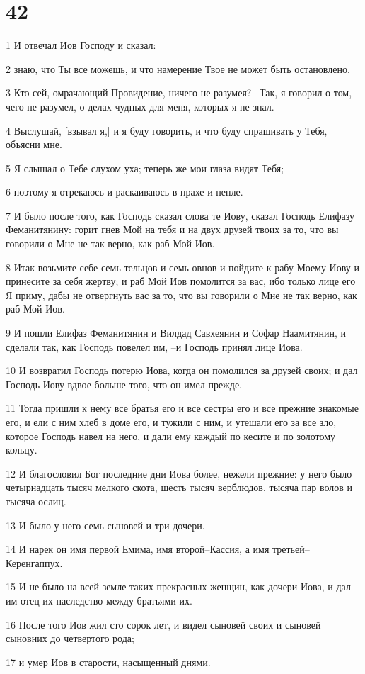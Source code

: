 \chapter{42}

\par 1 И отвечал Иов Господу и сказал:
\par 2 знаю, что Ты все можешь, и что намерение Твое не может быть остановлено.
\par 3 Кто сей, омрачающий Провидение, ничего не разумея? --Так, я говорил о том, чего не разумел, о делах чудных для меня, которых я не знал.
\par 4 Выслушай, [взывал я,] и я буду говорить, и что буду спрашивать у Тебя, объясни мне.
\par 5 Я слышал о Тебе слухом уха; теперь же мои глаза видят Тебя;
\par 6 поэтому я отрекаюсь и раскаиваюсь в прахе и пепле.
\par 7 И было после того, как Господь сказал слова те Иову, сказал Господь Елифазу Феманитянину: горит гнев Мой на тебя и на двух друзей твоих за то, что вы говорили о Мне не так верно, как раб Мой Иов.
\par 8 Итак возьмите себе семь тельцов и семь овнов и пойдите к рабу Моему Иову и принесите за себя жертву; и раб Мой Иов помолится за вас, ибо только лице его Я приму, дабы не отвергнуть вас за то, что вы говорили о Мне не так верно, как раб Мой Иов.
\par 9 И пошли Елифаз Феманитянин и Вилдад Савхеянин и Софар Наамитянин, и сделали так, как Господь повелел им, --и Господь принял лице Иова.
\par 10 И возвратил Господь потерю Иова, когда он помолился за друзей своих; и дал Господь Иову вдвое больше того, что он имел прежде.
\par 11 Тогда пришли к нему все братья его и все сестры его и все прежние знакомые его, и ели с ним хлеб в доме его, и тужили с ним, и утешали его за все зло, которое Господь навел на него, и дали ему каждый по кесите и по золотому кольцу.
\par 12 И благословил Бог последние дни Иова более, нежели прежние: у него было четырнадцать тысяч мелкого скота, шесть тысяч верблюдов, тысяча пар волов и тысяча ослиц.
\par 13 И было у него семь сыновей и три дочери.
\par 14 И нарек он имя первой Емима, имя второй--Кассия, а имя третьей--Керенгаппух.
\par 15 И не было на всей земле таких прекрасных женщин, как дочери Иова, и дал им отец их наследство между братьями их.
\par 16 После того Иов жил сто сорок лет, и видел сыновей своих и сыновей сыновних до четвертого рода;
\par 17 и умер Иов в старости, насыщенный днями.


